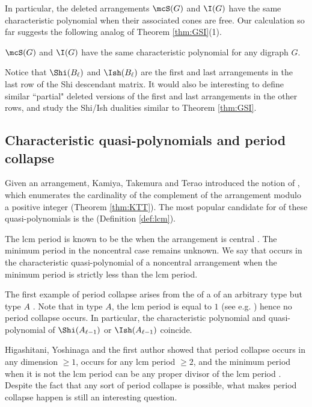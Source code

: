  In particular, the deleted arrangements $\mcS(G)$ and $\I(G)$ have the same characteristic polynomial when their associated cones are free. 
 Our calculation so far suggests the following analog of Theorem \ref{thm:GSI}(1). 
 \begin{conjecture}
\label{conj:same-CP}
 $\mcS(G)$ and $\I(G)$ have the same characteristic polynomial for any digraph $G$.
 \end{conjecture}
 
 Notice that $\Shi(B_{\ell})$ and $\Ish(B_{\ell})$ are the first and last arrangements in the last row of the Shi descendant matrix. 
 It would also be interesting to define similar  ``partial" deleted versions of the first and last arrangements in the other rows, and study the Shi/Ish dualities similar to  Theorem \ref{thm:GSI}.


\subsection{Characteristic quasi-polynomials and period collapse}
\label{subsec:period collapse}

Given an  arrangement, Kamiya, Takemura and Terao \cite{KTT08, KTT11} introduced the notion of , which enumerates the cardinality of the complement of the arrangement modulo a positive integer (Theorem \ref{thm:KTT}). 
The most popular candidate for  of these quasi-polynomials is the  (Definition \ref{def:lcm}). 

The lcm period is known to be the  when the arrangement is central \cite[Theorem 1.2]{HTY23}. 
The minimum period in the noncentral case remains unknown. 
We say that  occurs in the characteristic quasi-polynomial of a noncentral arrangement when the minimum period is strictly less than the lcm period. 


The first example of period collapse arises from the  of a  of an arbitrary type but type $A$ \cite[Theorem 5.1]{Y18W}. 
Note that in type $A$, the lcm period is equal to $1$ (see e.g. \cite[Corollary 3.2]{KTT10}) hence no period collapse occurs. 
In particular, the characteristic polynomial and quasi-polynomial of $\Shi(A_{\ell-1}) $ or $\Ish(A_{\ell-1}) $ coincide.  

Higashitani, Yoshinaga and the first author showed that period collapse occurs in any dimension $\ge 1$, occurs for any lcm period $\ge 2$, and the minimum period when it is not the lcm period can be any proper divisor of the lcm period \cite[Theorem 1.2]{HTY23}. 
Despite the fact that any sort of period collapse is possible, what makes period collapse happen is still an interesting question.

